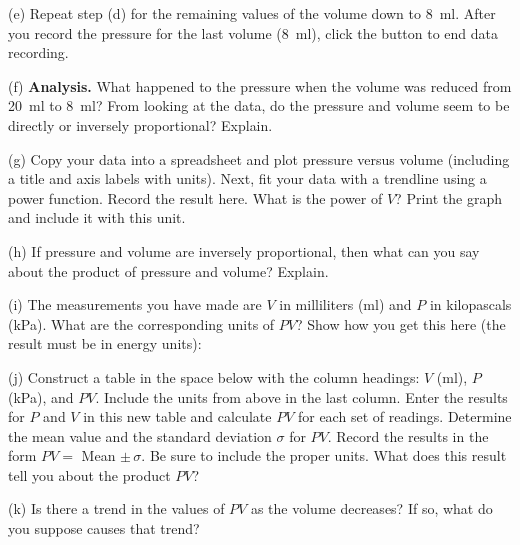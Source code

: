 (e) Repeat step (d) for the remaining values of the volume down to 8~ml.  After you record
the pressure for the last volume (8~ml), click the  button to end data recording.

(f) \textbf{Analysis.} What happened to the pressure when the volume was 
reduced from 20~ml to 8~ml? From looking at the data, do the pressure and 
volume seem to be directly or inversely proportional? Explain.
\vspace{25mm}

(g) Copy your data into a spreadsheet and plot pressure versus volume 
(including a title and axis labels with units). Next, fit your data with a 
trendline using a power function. Record the result here. What is the power of 
$V$? Print the graph and include it with this unit.
\vspace{25mm}

(h) If pressure and volume are inversely proportional, then what can you say
about the product of pressure and volume? Explain.
\vspace{25mm}

\newpage

(i) The measurements you have made are $V$ in milliliters (ml) and $P$ in 
kilopascals (kPa). What are the corresponding units of $PV$? Show how you get 
this here (the result must be in energy units):
\vspace{40mm}

(j) Construct a table in the space below with the column headings: $V$ (ml), $P$
(kPa), and $PV$. Include the units from above in the last column.
Enter the results for $P$ and $V$ in this new table and calculate
$PV$ for each set of readings. Determine the mean value and the standard deviation
$\sigma$ for $PV$. Record the results in the form 
$PV =$ Mean $\pm \, \sigma$. Be sure to include the proper units. 
What does this result tell you about the  product $PV$?

\vspace{12cm}

(k) Is there a trend in the values of $PV$ as the volume decreases? If so, 
what do you suppose causes that trend?







